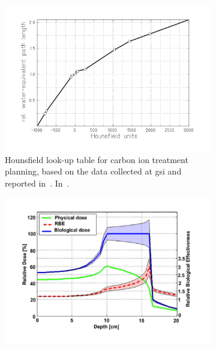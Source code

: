  \begin{figure}[!htbp]
 \begin{subfigure}[t]{.49\textwidth}
\centering
\includegraphics[width=0.92\linewidth]{03_GraphicFiles/chapter1_Introduction/HounsfieldUnits.pdf}	
\caption{Hounsfield look-up table for carbon ion treatment planning, based on the data collected at \gls{gsi} and reported in~\cite{Jakel2001}. In~\cite{Rietzel2007}.}
\label{chap1::fig::HU}
\end{subfigure}
 \begin{subfigure}[t]{.49\textwidth}
\centering
\includegraphics[width=0.92\linewidth]{03_GraphicFiles/chapter1_Introduction/rbeWeightedDose.pdf}

\end{subfigure}
\end{figure}
